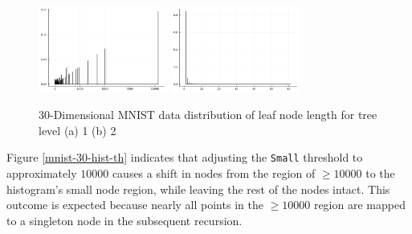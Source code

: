 \documentclass{juliacon}
\begin{document}
\begin{figure}[!ht]
  \centerline{
    \includegraphics[width=10pc]{figures/experiments/mnist_30/hist_1.png}
    \includegraphics[width=10pc]{figures/experiments/mnist_30/hist_2.png}
  }

  \caption{
    30-Dimensional MNIST data distribution of leaf node length for tree level
    (a) 1 (b) 2
  }
  \label{mnist-30-hist}
\end{figure}

Figure \ref{mnist-30-hist-th} indicates that adjusting the \verb|Small|
threshold to approximately $10000$ causes a shift in nodes from the region of
$\geq 10000$ to the histogram's small node region, while leaving the rest of
the nodes intact. This outcome is expected because nearly all points in the
$\geq 10000$ region are mapped to a singleton node in the subsequent recursion.
\end{document}
